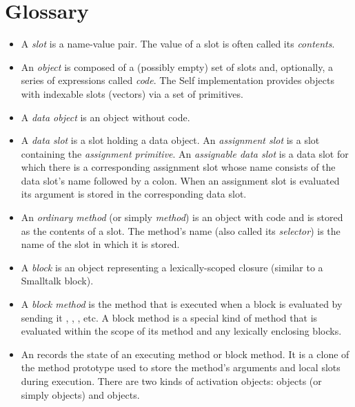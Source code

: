 \documentclass[letterpaper,10pt,english]{sphinxmanual}
\begin{document}
\section{Glossary}
\label{glossary:glossary}\label{glossary::doc}\begin{itemize}
\item {} 
A \emph{slot} is a name-value pair. The value of a slot is often called its \emph{contents}.

\item {} 
An \emph{object} is composed of a (possibly empty) set of slots and, optionally, a series of expressions called \emph{code}. The Self implementation provides objects with indexable slots (vectors) via a set of primitives.

\item {} 
A \emph{data object} is an object without code.

\item {} 
A \emph{data slot} is a slot holding a data object. An \emph{assignment slot} is a slot containing the \emph{assignment primitive}. An \emph{assignable data slot} is a data slot for which there is a corresponding assignment slot whose name consists of the data slot’s name followed by a colon. When an assignment slot is evaluated its argument is stored in the corresponding data slot.

\item {} 
An \emph{ordinary method} (or simply \emph{method}) is an object with code and is stored as the contents of a slot. The method’s name (also called its \emph{selector}) is the name of the slot in which it is stored.

\item {} 
A \emph{block} is an object representing a lexically-scoped closure (similar to a Smalltalk block).

\item {} 
A \emph{block method} is the method that is executed when a block is evaluated by sending it , , , etc. A block method is a special kind of method that is evaluated within the scope of its method and any lexically enclosing blocks.

\item {} 
An  records the state of an executing method or block method. It is a clone of the method prototype used to store the method’s arguments and local slots during execution. There are two kinds of activation objects:  objects (or simply  objects) and  objects.


\end{itemize}
\end{document}
